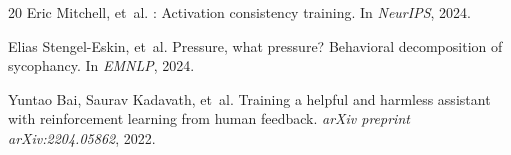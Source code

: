 \documentclass[11pt,a4paper]{article}
\begin{document}
\begin{thebibliography}{20}
Eric Mitchell, et~al.
: Activation consistency training.
\newblock In \emph{NeurIPS}, 2024.

Elias Stengel-Eskin, et~al.
\newblock Pressure, what pressure? {B}ehavioral decomposition of sycophancy.
\newblock In \emph{EMNLP}, 2024.

Yuntao Bai, Saurav Kadavath, et~al.
\newblock Training a helpful and harmless assistant with reinforcement learning from human feedback.
\newblock \emph{arXiv preprint arXiv:2204.05862}, 2022.

\end{thebibliography}
\end{document}
